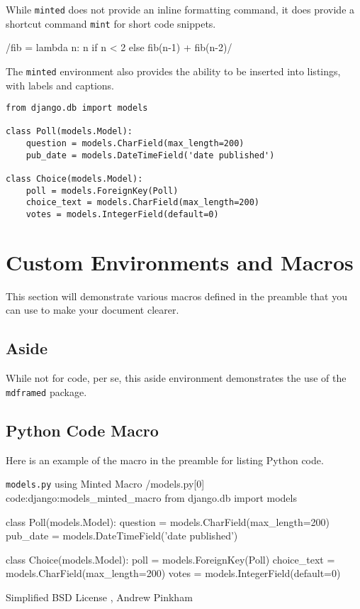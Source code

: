 While \verb|minted| does not provide an inline formatting command, it does provide a shortcut command \verb|mint| for short code snippets.

/fib = lambda n: n if n < 2 else fib(n-1) + fib(n-2)/

The \verb|minted| environment also provides the ability to be inserted into listings, with labels and captions.

\begin{listing}[H]
\begin{verbatim}
from django.db import models

class Poll(models.Model):
    question = models.CharField(max_length=200)
    pub_date = models.DateTimeField('date published')

class Choice(models.Model):
    poll = models.ForeignKey(Poll)
    choice_text = models.CharField(max_length=200)
    votes = models.IntegerField(default=0)
\end{verbatim}
\cprotect\caption{\verb|models.py| from Django Tutorial using Minted}
\label{code:django:models_basic_minted}
\end{listing}

\section[Macros]{Custom Environments and Macros}

This section will demonstrate various macros defined in the preamble that you can use to make your document clearer.

\subsection{Aside}

While not for code, per se, this aside environment demonstrates the use of the \verb|mdframed| package.

\begin{aside}
\lipsum[2] %
\end{aside}

\subsection{Python Code Macro}
Here is an example of the macro in the preamble for listing Python code.

\begin{pycode}%
      {\texttt{models.py} using Minted Macro}%
      {/models.py}[0]%
      {code:django:models_minted_macro}
from django.db import models

class Poll(models.Model):
    question = models.CharField(max_length=200)
    pub_date = models.DateTimeField('date published')

class Choice(models.Model):
    poll = models.ForeignKey(Poll)
    choice_text = models.CharField(max_length=200)
    votes = models.IntegerField(default=0)
\end{pycode}

\begin{center}
Simplified BSD License , Andrew Pinkham
 \end{center}


